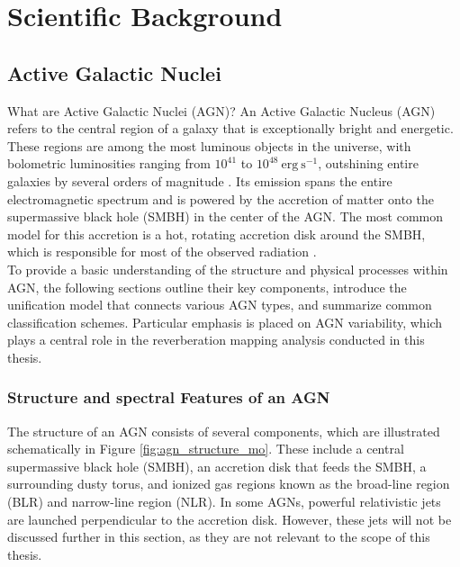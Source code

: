\chapter{Scientific Background}
\label{chap:scientific_background}

\section{Active Galactic Nuclei}
\label{sec:agn}

What are Active Galactic Nuclei (AGN)? An Active Galactic Nucleus (AGN) refers to the central region of a galaxy that is exceptionally bright and energetic. These regions are among the most luminous objects in the universe, with bolometric luminosities ranging from $10^{41}$ to $10^{48} \ \mathrm{erg \ s^{-1}}$, outshining entire galaxies by several orders of magnitude \parencite{peterson1997introduction}.
Its emission spans the entire electromagnetic spectrum and is powered by the accretion of matter onto the supermassive black hole (SMBH) in the center of the AGN. The most common model for this accretion is a hot, rotating accretion disk around the SMBH, which is responsible for most of the observed radiation \parencite{shakura1973black}.\\
To provide a basic understanding of the structure and physical processes within AGN, the following sections outline their key components, introduce the unification model that connects various AGN types, and summarize common classification schemes. Particular emphasis is placed on AGN variability, which plays a central role in the reverberation mapping analysis conducted in this thesis.


\subsection{Structure and spectral Features of an AGN}
\label{sec:agn_structure}

The structure of an AGN consists of several components, which are illustrated schematically in Figure \ref{fig:agn_structure_mo}. These include a central supermassive black hole (SMBH), an accretion disk that feeds the SMBH, a surrounding dusty torus, and ionized gas regions known as the broad-line region (BLR) and narrow-line region (NLR). In some AGNs, powerful relativistic jets are launched perpendicular to the accretion disk. However, these jets will not be discussed further in this section, as they are not relevant to the scope of this thesis. 

